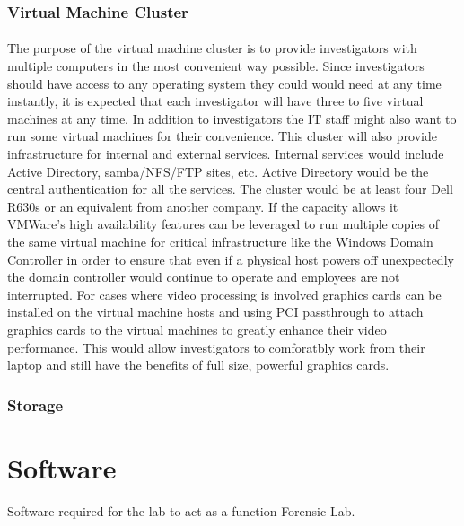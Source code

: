 \documentclass{article}
\begin{document}
\subsubsection{Virtual Machine Cluster} \paragraph{} The purpose of the virtual machine cluster is to provide investigators with multiple computers in the most convenient way possible. Since investigators should have access to any operating system they could would need at any time instantly, it is expected that each investigator will have three to five virtual machines at any time. In addition to investigators the IT staff might also want to run some virtual machines for their convenience. This cluster will also provide infrastructure for internal and external services. Internal services would include Active Directory, samba/NFS/FTP sites, etc. Active Directory would be the central authentication for all the services. The cluster would be at least four Dell R630s or an equivalent from another company. If the capacity allows it VMWare's high availability features can be leveraged to run multiple copies of the same virtual machine for critical infrastructure like the Windows Domain Controller in order to ensure that even if a physical host powers off unexpectedly the domain controller would continue to operate and employees are not interrupted. For cases where video processing is involved graphics cards can be installed on the virtual machine hosts and using PCI passthrough to attach graphics cards to the virtual machines to greatly enhance their video performance. This would allow investigators to comforatbly work from their laptop and still have the benefits of full size, powerful graphics cards.
\subsubsection{Storage} \paragraph{} 


\section{Software}
Software required for the lab to act as a function Forensic Lab.
\end{document}
